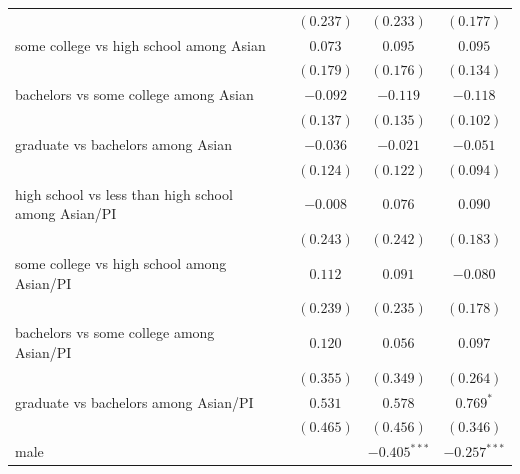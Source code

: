\documentclass[
  12pt,
  letterpaper,
]{article}
\begin{document}
\begin{table}
\begin{center}
\begin{tabular}{l c c c c}
                                                     &                & $(0.237)$      & $(0.233)$      & $(0.177)$      \\
some college vs high school among Asian              &                & $0.073$        & $0.095$        & $0.095$        \\
                                                     &                & $(0.179)$      & $(0.176)$      & $(0.134)$      \\
bachelors vs some college among Asian                &                & $-0.092$       & $-0.119$       & $-0.118$       \\
                                                     &                & $(0.137)$      & $(0.135)$      & $(0.102)$      \\
graduate vs bachelors among Asian                    &                & $-0.036$       & $-0.021$       & $-0.051$       \\
                                                     &                & $(0.124)$      & $(0.122)$      & $(0.094)$      \\
high school vs less than high school among Asian/PI  &                & $-0.008$       & $0.076$        & $0.090$        \\
                                                     &                & $(0.243)$      & $(0.242)$      & $(0.183)$      \\
some college vs high school among Asian/PI           &                & $0.112$        & $0.091$        & $-0.080$       \\
                                                     &                & $(0.239)$      & $(0.235)$      & $(0.178)$      \\
bachelors vs some college among Asian/PI             &                & $0.120$        & $0.056$        & $0.097$        \\
                                                     &                & $(0.355)$      & $(0.349)$      & $(0.264)$      \\
graduate vs bachelors among Asian/PI                 &                & $0.531$        & $0.578$        & $0.769^{*}$    \\
                                                     &                & $(0.465)$      & $(0.456)$      & $(0.346)$      \\
male                                                 &                &                & $-0.405^{***}$ & $-0.257^{***}$ \\

\end{tabular}
\end{center}
\end{table}
\end{document}
